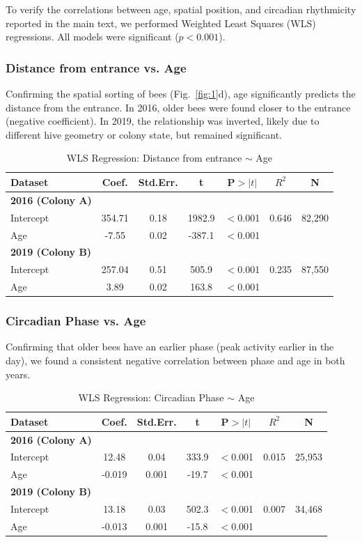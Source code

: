 \documentclass{article}
\newcommand{\added}[1]{{\color{blue}#1}}
\newcommand{\added}[1]{#1}
\begin{document}
\added{
To verify the correlations between age, spatial position, and circadian rhythmicity reported in the main text, we performed Weighted Least Squares (WLS) regressions. All models were significant ($p < 0.001$).

\subsubsection*{Distance from entrance vs. Age}
Confirming the spatial sorting of bees (Fig.~\ref{fig:1}d), age significantly predicts the distance from the entrance. In 2016, older bees were found closer to the entrance (negative coefficient). In 2019, the relationship was inverted, likely due to different hive geometry or colony state, but remained significant.

\begin{table}[h]
\centering
\caption{WLS Regression: Distance from entrance $\sim$ Age}
\label{tab:dist_age}
\begin{tabular}{lcccccc}
\toprule
Dataset & Coef. & Std.Err. & t & P$>|t|$ & $R^2$ & N \\
\midrule
\textbf{2016 (Colony A)} & & & & & & \\
Intercept & 354.71 & 0.18 & 1982.9 & $<$0.001 & 0.646 & 82,290 \\
Age & -7.55 & 0.02 & -387.1 & $<$0.001 & & \\
\midrule
\textbf{2019 (Colony B)} & & & & & & \\
Intercept & 257.04 & 0.51 & 505.9 & $<$0.001 & 0.235 & 87,550 \\
Age & 3.89 & 0.02 & 163.8 & $<$0.001 & & \\
\bottomrule
\end{tabular}
\end{table}

\subsubsection*{Circadian Phase vs. Age}
Confirming that older bees have an earlier phase (peak activity earlier in the day), we found a consistent negative correlation between phase and age in both years.

\begin{table}[h]
\centering
\caption{WLS Regression: Circadian Phase $\sim$ Age}
\label{tab:phase_age}
\begin{tabular}{lcccccc}
\toprule
Dataset & Coef. & Std.Err. & t & P$>|t|$ & $R^2$ & N \\
\midrule
\textbf{2016 (Colony A)} & & & & & & \\
Intercept & 12.48 & 0.04 & 333.9 & $<$0.001 & 0.015 & 25,953 \\
Age & -0.019 & 0.001 & -19.7 & $<$0.001 & & \\
\midrule
\textbf{2019 (Colony B)} & & & & & & \\
Intercept & 13.18 & 0.03 & 502.3 & $<$0.001 & 0.007 & 34,468 \\
Age & -0.013 & 0.001 & -15.8 & $<$0.001 & & \\
\bottomrule
\end{tabular}
\end{table}

}
\end{document}
